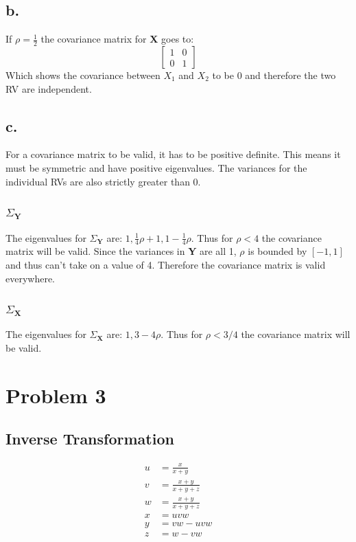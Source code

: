 \documentclass[12pt]{article}
\begin{document}
\subsection{b.}
If $\rho = \frac{1}{2}$ the covariance matrix for \textbf{X} goes to:
\[
  \begin{bmatrix}
    1 & 0 \\
    0 & 1
  \end{bmatrix}
\]
Which shows the covariance between $X_1$ and $X_2$ to be 0 and therefore the two RV are independent. 

\subsection{c.}
For a covariance matrix to be valid, it has to be positive definite. This means it must be symmetric and have positive eigenvalues.
The variances for the individual RVs are also strictly greater than 0.
\subsubsection{$\Sigma_{\bm{Y}}$}
The eigenvalues for $\Sigma_{\bm{Y}}$ are: $1, \frac{1}{4}\rho + 1, 1 - \frac{1}{4}\rho$. Thus for $\rho < 4$ the covariance matrix
will be valid. Since the variances in \textbf{Y} are all 1, $\rho$ is bounded by $[-1,1]$ and thus can't take on a value of 4. Therefore
the covariance matrix is valid everywhere.

\subsubsection{$\Sigma_{\bm{X}}$}
The eigenvalues for $\Sigma_{\bm{X}}$ are: $1, 3 - 4\rho$. Thus for $\rho < 3/4$ the covariance matrix will be valid. 

\section{Problem 3}
\subsection{Inverse Transformation}
\begin{align*}
  u &= \frac{x}{x + y} \\
  v &= \frac{x + y}{x+y+z} \\
  w &= \frac{x + y}{x+y+z} \\
  x &= uvw \\
  y &= vw - uvw \\
  z &= w - vw \\
\end{align*}
\end{document}
